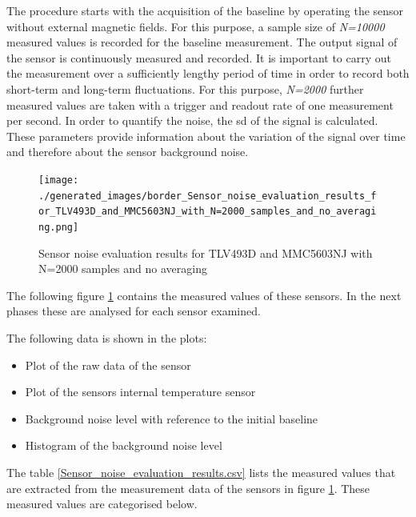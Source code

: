 The procedure starts with the acquisition of the baseline by operating
the sensor without external magnetic fields. For this purpose, a sample
size of \emph{N=10000} measured values is recorded for the baseline
measurement. The output signal of the sensor is continuously measured
and recorded. It is important to carry out the measurement over a
sufficiently lengthy period of time in order to record both short-term
and long-term fluctuations. For this purpose, \emph{N=2000} further
measured values are taken with a trigger and readout rate of one
measurement per second. In order to quantify the noise, the \gls{sd} of
the signal is calculated. These parameters provide information about the
variation of the signal over time and therefore about the sensor
background noise.

\begin{figure}
\centering
\texttt{[image: ./generated\_images/border\_Sensor\_noise\_evaluation\_results\_for\_TLV493D\_and\_MMC5603NJ\_with\_N=2000\_samples\_and\_no\_averaging.png]}
\caption{Sensor noise evaluation results for TLV493D and MMC5603NJ with
N=2000 samples and no averaging
\label{Sensor_noise_evaluation_results_for_TLV493D_and_MMC5603NJ_with_N=2000_samples_and_no_averaging.png}}
\end{figure}

The following figure
\ref{Sensor_noise_evaluation_results_for_TLV493D_and_MMC5603NJ_with_N=2000_samples_and_no_averaging.png}
contains the measured values of these sensors. In the next phases these
are analysed for each sensor examined.

The following data is shown in the plots:

\begin{itemize}
\tightlist
\item
  Plot of the raw data of the sensor
\item
  Plot of the sensors internal temperature sensor
\item
  Background noise level with reference to the initial baseline
\item
  Histogram of the background noise level
\end{itemize}

The table \ref{Sensor_noise_evaluation_results.csv} lists the measured
values that are extracted from the measurement data of the sensors in
figure
\ref{Sensor_noise_evaluation_results_for_TLV493D_and_MMC5603NJ_with_N=2000_samples_and_no_averaging.png}.
These measured values are categorised below.

